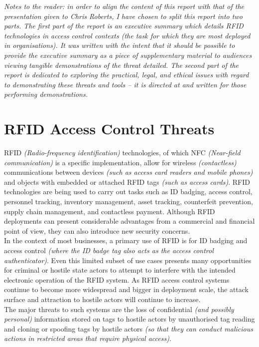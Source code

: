 \textcolor{deep-gray}{\textit{Notes to the reader: in order to align the content of this report with that of the presentation given to Chris Roberts, I have chosen to split this report into two parts. The first part of the report is an executive summary which details RFID technologies in access control contexts (the task for which they are most deployed in organisations). It was written with the intent that it should be possible to provide the executive summary as a piece of supplementary material to audiences viewing tangible demonstrations of the threat detailed. The second part of the report is dedicated to exploring the practical, legal, and ethical issues with regard to demonstrating these threats and tools -- it is directed at and written for those performing demonstrations.}}

\section{RFID Access Control Threats}
RFID \textit{(Radio-frequency identification)} technologies, of which NFC \textit{(Near-field communication)} is a specific implementation, allow for wireless \textit{(contactless)} communications between devices \textit{(such as access card readers and mobile phones)} and objects with embedded or attached RFID tags \textit{(such as access cards)}. RFID technologies are being used to carry out tasks such as ID badging, access control, personnel tracking, inventory management, asset tracking, counterfeit prevention, supply chain management, and contactless payment. Although RFID deployments can present considerable advantages from a commercial and financial point of view, they can also introduce new security concerns.\\

\noindent In the context of most businesses, a primary use of RFID is for ID badging and access control \textit{(where the ID badge tag also acts as the access control authenticator)}. Even this limited subset of use cases presents many opportunities for criminal or hostile state actors to attempt to interfere with the intended electronic operation of the RFID system. As RFID access control systems continue to become more widespread and bigger in deployment scale, the attack surface and attraction to hostile actors will continue to increase.\\

\noindent The major threats to such systems are the loss of confidential \textit{(and possibly personal)} information stored on tags to hostile actors by unauthorised tag reading and cloning or spoofing tags by hostile actors \textit{(so that they can conduct malicious actions in restricted areas that require physical access)}.\\

